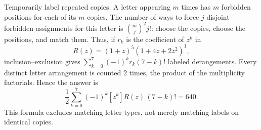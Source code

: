 Temporarily label repeated copies. A letter appearing $m$ times has $m$ forbidden positions for each of its $m$ copies. The number of ways to force $j$ disjoint forbidden assignments for this letter is $\binom mj^2j!$: choose the copies, choose the positions, and match them.
Thus, if $r_k$ is the coefficient of $z^k$ in
\[
R(z)=(1+z)^{5}(1+4z+2z^2)^{1},
\]
inclusion--exclusion gives $\sum_{k=0}^{7}(-1)^kr_k(7-k)!$ labeled derangements. Every distinct letter arrangement is counted 2 times, the product of the multiplicity factorials. Hence the answer is
\[
\boxed{\dfrac{1}{2}\sum_{k=0}^{7}(-1)^k[z^k]R(z)\,(7-k)!=640}.
\]
This formula excludes matching letter types, not merely matching labels on identical copies.
